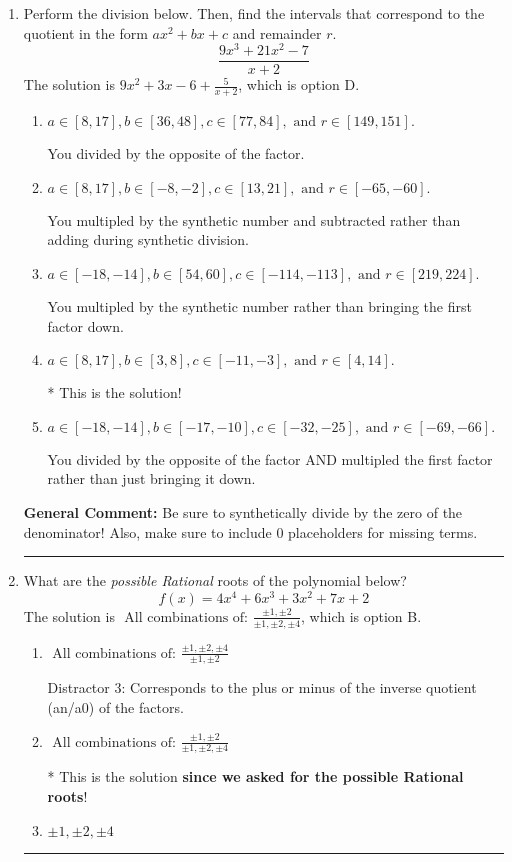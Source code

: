 \documentclass{extbook}[14pt]
\newcommand{\litem}[1]{\item #1

\rule{\textwidth}{0.4pt}}
\begin{document}
\begin{enumerate}\litem{
Perform the division below. Then, find the intervals that correspond to the quotient in the form $ax^2+bx+c$ and remainder $r$.
\[ \frac{9x^{3} +21 x^{2} -7}{x + 2} \]The solution is \( 9x^{2} +3 x -6 + \frac{5}{x + 2} \), which is option D.\begin{enumerate}[label=\Alph*.]
\item \( a \in [8, 17], b \in [36, 48], c \in [77, 84], \text{ and } r \in [149, 151]. \)

 You divided by the opposite of the factor.
\item \( a \in [8, 17], b \in [-8, -2], c \in [13, 21], \text{ and } r \in [-65, -60]. \)

 You multipled by the synthetic number and subtracted rather than adding during synthetic division.
\item \( a \in [-18, -14], b \in [54, 60], c \in [-114, -113], \text{ and } r \in [219, 224]. \)

 You multipled by the synthetic number rather than bringing the first factor down.
\item \( a \in [8, 17], b \in [3, 8], c \in [-11, -3], \text{ and } r \in [4, 14]. \)

* This is the solution!
\item \( a \in [-18, -14], b \in [-17, -10], c \in [-32, -25], \text{ and } r \in [-69, -66]. \)

 You divided by the opposite of the factor AND multipled the first factor rather than just bringing it down.
\end{enumerate}

\textbf{General Comment:} Be sure to synthetically divide by the zero of the denominator! Also, make sure to include 0 placeholders for missing terms.
}
\litem{
What are the \textit{possible Rational} roots of the polynomial below?
\[ f(x) = 4x^{4} +6 x^{3} +3 x^{2} +7 x + 2 \]The solution is \( \text{ All combinations of: }\frac{\pm 1,\pm 2}{\pm 1,\pm 2,\pm 4} \), which is option B.\begin{enumerate}[label=\Alph*.]
\item \( \text{ All combinations of: }\frac{\pm 1,\pm 2,\pm 4}{\pm 1,\pm 2} \)

 Distractor 3: Corresponds to the plus or minus of the inverse quotient (an/a0) of the factors. 
\item \( \text{ All combinations of: }\frac{\pm 1,\pm 2}{\pm 1,\pm 2,\pm 4} \)

* This is the solution \textbf{since we asked for the possible Rational roots}!
\item \( \pm 1,\pm 2,\pm 4 \)


\end{enumerate}}
\end{enumerate}
\end{document}
